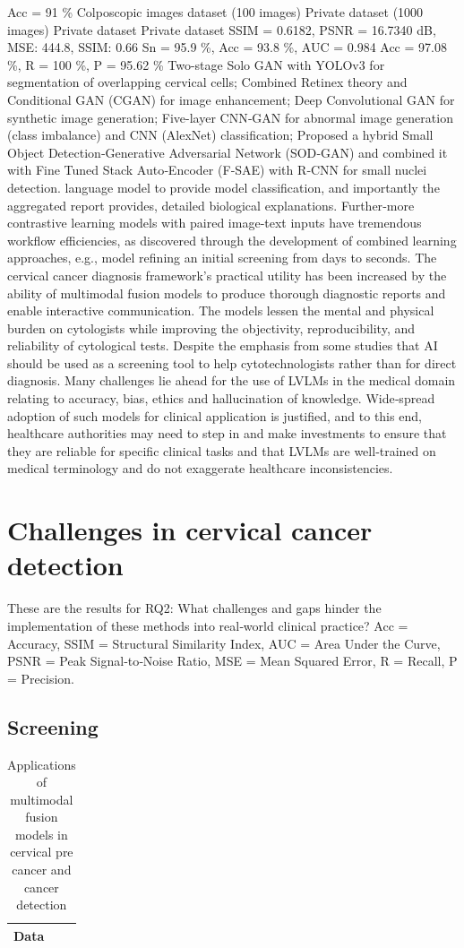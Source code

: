 \documentclass{svjour3}
\begin{document}
Acc = 91 \%
Colposcopic images dataset (100 images)
Private dataset (1000 images)
Private dataset
Private dataset
SSIM = 0.6182, PSNR = 16.7340 dB, MSE: 444.8, SSIM: 0.66
Sn = 95.9 \%, Acc = 93.8 \%, AUC = 0.984
Acc = 97.08 \%, R = 100 \%, P = 95.62 \%
Two-stage Solo GAN with YOLOv3 for segmentation of overlapping cervical cells; Combined Retinex theory and Conditional GAN (CGAN) for image enhancement; Deep Convolutional GAN for synthetic image generation; Five-layer CNN‑GAN for abnormal image generation (class imbalance) and CNN (AlexNet) classification; Proposed a hybrid Small Object Detection‑Generative Adversarial Network (SOD‑GAN) and combined it with Fine Tuned Stack Auto‑Encoder (F‑SAE) with R‑CNN for small nuclei detection.
language model to provide model classification, and importantly the aggregated report provides, detailed biological explanations. Further‑more contrastive learning models with paired image‑text inputs have tremendous workflow efficiencies, as discovered through the development of combined learning approaches, e.g., model refining an initial screening from days to seconds.
The cervical cancer diagnosis framework’s practical utility has been increased by the ability of multimodal fusion models to produce thorough diagnostic reports and enable interactive communication. The models lessen the mental and physical burden on cytologists while improving the objectivity, reproducibility, and reliability of cytological tests. Despite the emphasis from some studies that AI should be used as a screening tool to help cytotechnologists rather than for direct diagnosis. Many challenges lie ahead for the use of LVLMs in the medical domain relating to accuracy, bias, ethics and hallucination of knowledge. Wide‑spread adoption of such models for clinical application is justified, and to this end, healthcare authorities may need to step in and make investments to ensure that they are reliable for specific clinical tasks and that LVLMs are well‑trained on medical terminology and do not exaggerate healthcare inconsistencies.
\section{Challenges in cervical cancer detection}
These are the results for RQ2: What challenges and gaps hinder the implementation of these methods into real‑world clinical practice?
Acc = Accuracy, SSIM = Structural Similarity Index, AUC = Area Under the Curve, PSNR = Peak Signal‑to‑Noise Ratio, MSE = Mean Squared Error, R = Recall, P = Precision.
\subsection{Screening}
\begin{table}[htbp]
\centering
\caption{Applications of multimodal fusion models in cervical pre cancer and cancer detection}
\label{tab:applications}
\begin{tabular}{l}
\hline
Data \\
\hline
\end{tabular}
\end{table}
\end{document}
